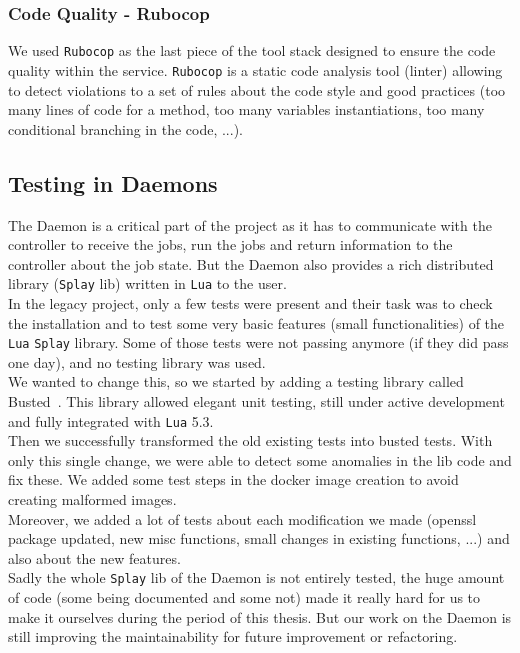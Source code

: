 \documentclass{eplmastersthesis}
\begin{document}
        \subsubsection{Code Quality - Rubocop}

          We used \texttt{Rubocop} as the last piece of the tool stack designed to ensure
          the code quality within the service. \texttt{Rubocop} is a static code analysis
          tool (linter) allowing to detect violations to a set of rules about
          the code style and good practices (too many lines of code for a method,
          too many variables instantiations, too many conditional branching
          in the code, ...).

      \subsection{Testing in Daemons}

        The Daemon is a critical part of the project as it has to communicate
        with the controller to receive the jobs, run the jobs and return
        information to the controller about the job state. But the Daemon also
        provides a rich distributed library (\texttt{Splay} lib) written in \texttt{Lua} to the user.\\
        In the legacy project, only a few tests were present and their
        task was to check the installation and to test some very basic features
        (small functionalities) of the \texttt{Lua} \texttt{Splay} library. Some of those tests
        were not passing anymore (if they did pass one day), and no testing
        library was used.\\

        We wanted to change this, so we started by adding a testing library
        called Busted~\cite{busted}. This library allowed elegant unit testing,
        still under active development and fully integrated with \texttt{Lua} 5.3.\\
        Then we successfully transformed the old existing tests into busted
        tests. With only this single change, we were able to detect some
        anomalies in the lib code and fix these. We added some test steps
        in the docker image creation to avoid creating malformed images.\\

        Moreover, we added a lot of tests about each modification we made
        (openssl package updated, new misc functions, small changes in existing
        functions, ...) and also about the new features.\\
        Sadly the whole \texttt{Splay} lib of the Daemon is not entirely tested,
        the huge amount of code (some being documented and some not) made it
        really hard for us to make it ourselves during the period of this
        thesis. But our work on the Daemon is still improving the maintainability
        for future improvement or refactoring.
\end{document}

